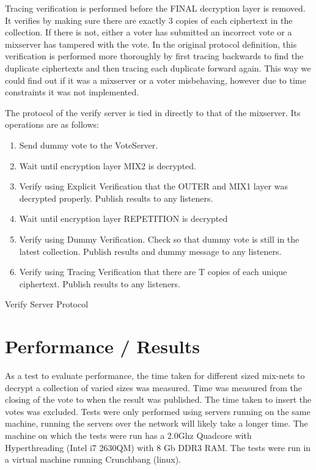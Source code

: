 \documentclass[a4paper,11pt]{kth-mag}
\begin{document}
Tracing verification is performed before the FINAL decryption layer is removed. It verifies by making sure there are exactly 3 copies of each ciphertext in the collection. If there is not, either a voter has submitted an incorrect vote or a mixserver has tampered with the vote. In the original protocol definition, this verification is performed more thoroughly by first tracing backwards to find the duplicate ciphertexts and then tracing each duplicate forward again. This way we could find out if it was a mixserver or a voter misbehaving, however due to time constraints it was not implemented.

The protocol of the verify server is tied in directly to that of the mixserver. Its operations are as follows:
\begin{framed}
\begin{enumerate}
	\item  Send dummy vote to the VoteServer.
	\item  Wait until encryption layer MIX2 is decrypted.
	\item  Verify using Explicit Verification that the OUTER and MIX1 layer was decrypted properly. Publish results to any listeners.
	\item  Wait until encryption layer REPETITION is decrypted
	\item Verify using Dummy Verification. Check so that dummy vote is still in the latest collection. Publish results and dummy message to any listeners.
	\item Verify using Tracing Verification that there are T copies of each unique ciphertext. Publish results to any listeners. 
\end{enumerate}
\end{framed}
\begin{center}
Verify Server Protocol
\end{center}

\chapter{Performance / Results}
As a test to evaluate performance, the time taken for different sized mix-nets to decrypt a collection of varied sizes was measured. Time was measured from the closing of the vote to when the result was published. The time taken to insert the votes was excluded. Tests were only performed using servers running on the same machine, running the servers over the network will likely take a longer time. The machine on which the tests were run has a 2.0Ghz Quadcore with Hyperthreading (Intel i7 2630QM) with 8 Gb DDR3 RAM. The tests were run in a virtual machine running Crunchbang (linux).
\end{document}
